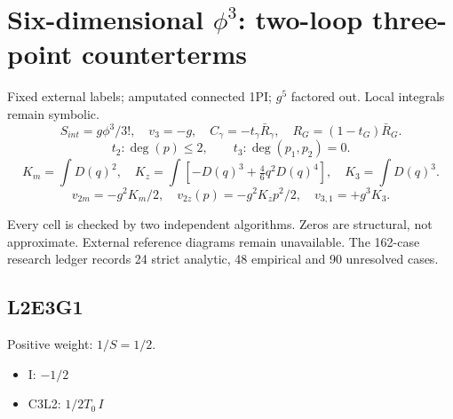 \documentclass{article}
\begin{document}
\section*{Six-dimensional $\phi^3$: two-loop three-point counterterms}
Fixed external labels; amputated connected 1PI; $g^5$ factored out. Local integrals remain symbolic.
\[S_{int}=g\phi^3/3!,\quad v_3=-g,\quad C_\gamma=-t_\gamma\bar R_\gamma,\quad R_G=(1-t_G)\bar R_G.\]
\[t_2: \deg(p)\le2,\qquad t_3: \deg(p_1,p_2)=0.\]
\[K_m=\int D(q)^2,\quad K_z=\int[-D(q)^3+\tfrac46q^2D(q)^4],\quad K_3=\int D(q)^3.\]
\[v_{2m}=-g^2K_m/2,\quad v_{2z}(p)=-g^2K_zp^2/2,\quad v_{3,1}=+g^3K_3.\]
\begin{center}\end{center}
Every cell is checked by two independent algorithms. Zeros are structural, not approximate.
External reference diagrams remain unavailable. The 162-case research ledger records 24 strict analytic, 48 empirical and 90 unresolved cases.
\subsection*{L2E3G1}

Positive weight: $1/S=1/2$.
\begin{itemize}
\item I: $- 1/2$
\item C3L2: $1/2 T_0\,I$
\end{itemize}
\end{document}
